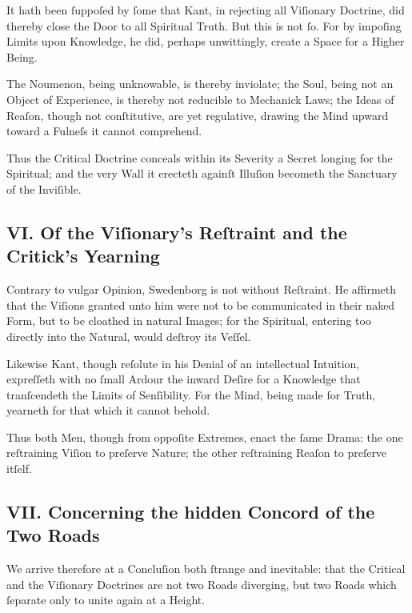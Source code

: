 \documentclass[12pt]{article}
\begin{document}
It hath been ſuppoſed by ſome that Kant, in rejecting all Viſionary Doctrine, 
did thereby close the Door to all Spiritual Truth. But this is not ſo. For by 
impoſing Limits upon Knowledge, he did, perhaps unwittingly, create a Space 
for a Higher Being.

The Noumenon, being unknowable, is thereby inviolate; the Soul, being not an 
Object of Experience, is thereby not reducible to Mechanick Laws; the Ideas of 
Reaſon, though not conſtitutive, are yet regulative, drawing the Mind upward 
toward a Fulneſs it cannot comprehend.

Thus the Critical Doctrine conceals within its Severity a Secret longing for 
the Spiritual; and the very Wall it erecteth againſt Illuſion becometh the 
Sanctuary of the Inviſible.

\subsection*{VI. Of the Viſionary’s Reſtraint and the Critick’s Yearning}

Contrary to vulgar Opinion, Swedenborg is not without Reſtraint. He 
affirmeth that the Viſions granted unto him were not to be communicated in 
their naked Form, but to be cloathed in natural Images; for the Spiritual, 
entering too directly into the Natural, would deſtroy its Veſſel.

Likewise Kant, though reſolute in his Denial of an intellectual Intuition, 
expreſſeth with no ſmall Ardour the inward Deſire for a Knowledge that 
tranſcendeth the Limits of Senſibility. For the Mind, being made for Truth, 
yearneth for that which it cannot behold.

Thus both Men, though from oppoſite Extremes, enact the ſame Drama: the one 
reſtraining Viſion to preſerve Nature; the other reſtraining Reaſon to 
preſerve itſelf.

\subsection*{VII. Concerning the hidden Concord of the Two Roads}

We arrive therefore at a Concluſion both ſtrange and inevitable: that the 
Critical and the Viſionary Doctrines are not two Roads diverging, but two Roads 
which ſeparate only to unite again at a Height.
\end{document}
